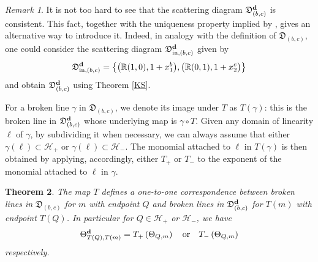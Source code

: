 \documentclass[10pt]{amsart}
\newtheorem{theorem}{Theorem}[section]
\theoremstyle{remark}
\newtheorem{remark}[theorem]{Remark}
\numberwithin{equation}{section}
\newcommand{\RR}{\mathbb{R}}
\newcommand{\fD}{\mathfrak{D}}
\newcommand{\bfd}{{\bf d}}
\begin{document}
\begin{remark}
  It is not too hard to see that the scattering diagram $\fD_{(b,c)}^\bfd$ is
  consistent. This fact, together with the uniqueness property implied by
  \cite[Theorem 1.7]{GHKK}, gives an alternative way to introduce it. Indeed, in
  analogy with the definition of $\fD_{(b,c)}$, one could consider the
  scattering diagram
  $\fD_{\mathrm{in},(b,c)}^\bfd$ given by 
  \[
    \fD_{\mathrm{in},(b,c)}^\bfd=
    \left\{
      \big(\RR (1,0), 1+x_1^b\big), 
      \big(\RR (0,1), 1+x_2^c\big)
    \right\}
  \]
  and obtain $\fD_{(b,c)}^\bfd$ using Theorem \ref{KS}. 
\end{remark}

For a broken line $\gamma$ in $\fD_{(b,c)}$, we denote its image under $T$ as
$T(\gamma)$: this is the broken line in $\fD_{(b,c)}^\bfd$ whose underlying map
is $\gamma\circ T$. Given any domain of linearity $\ell$ of $\gamma$, by
subdividing it when necessary, we can always assume that either $\gamma(\ell)
\subset \mathcal{H}_{+} $ or $\gamma(\ell)\subset \mathcal{H}_{-}$. The monomial
attached to $\ell$ in $T(\gamma)$ is then obtained by applying, accordingly, either
$T_+$ or $T_-$ to the exponent of the monomial attached to $\ell$ in $\gamma$.

\begin{theorem}
  \label{thm:T_on_broken_lines}
  The map $T$ defines a one-to-one correspondence between broken lines in $\fD_{(b,c)}$
  for $m$ with endpoint $Q$ and broken lines in $\fD_{(b,c)}^\bfd$ for $T(m)$
  with endpoint $T(Q)$. In particular for $Q \in \mathcal{H}_+$ or $\mathcal{H}_-$,
  we have
  \[ 
    \Theta^\bfd_{T(Q),T( m)} = 
    T_{+} \left(\Theta_{Q, m}\right) 
    \quad
    \mbox{or} 
    \quad
    T_{-} \left(\Theta_{Q, m}\right)
  \]
  respectively.
\end{theorem}
\end{document}
